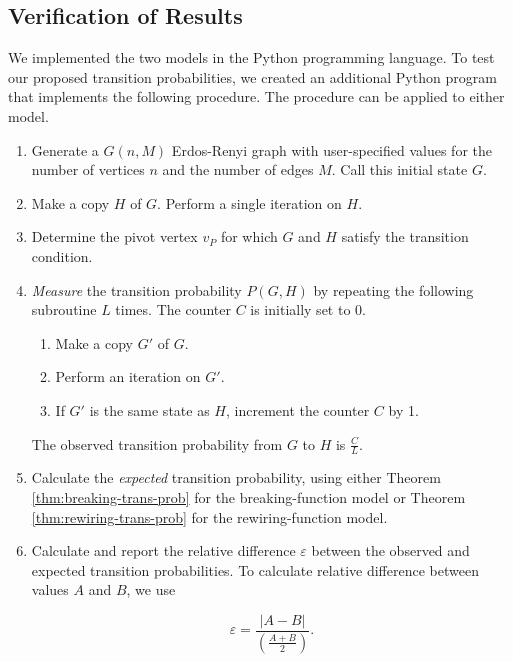 \documentclass[a4paper,10pt]{article}
\begin{document}
\subsection{Verification of Results}

We implemented the two models in the Python programming language. To test our proposed transition probabilities, we created an additional Python program that implements the following procedure. The procedure can be applied to either model.

\begin{enumerate}
 \item Generate a $G(n, M)$ Erdos-Renyi graph with user-specified values for the number of vertices $n$ and the number of edges $M$. Call this initial state $G$.
 \item Make a copy $H$ of $G$. Perform a single iteration on $H$.
 \item Determine the pivot vertex $v_P$ for which $G$ and $H$ satisfy the transition condition.
 \item \emph{Measure} the transition probability $P(G, H)$ by repeating the following subroutine $L$ times. The counter $C$ is initially set to 0.

    \begin{enumerate}
      \item Make a copy $G'$ of $G$.
      \item Perform an iteration on $G'$.
      \item If $G'$ is the same state as $H$, increment the counter $C$ by 1.
    \end{enumerate}

  The observed transition probability from $G$ to $H$ is $\frac{C}{L}$.

 \item Calculate the \emph{expected} transition probability, using either Theorem \ref{thm:breaking-trans-prob} for the breaking-function model or Theorem \ref{thm:rewiring-trans-prob} for the rewiring-function model.

 \item Calculate and report the relative difference $\varepsilon$ between the observed and expected transition probabilities. To calculate relative difference between values $A$ and $B$, we use

 \begin{equation}
  \varepsilon = \frac{|A - B|}{(\frac{A + B}{2})}.
 \end{equation}

\end{enumerate}
\end{document}
